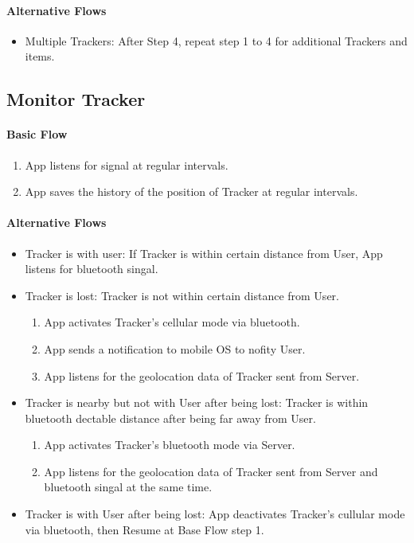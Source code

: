 \documentclass[12pt,a4paper]{article}
\begin{document}
\begin{appendices}
          \paragraph{Alternative Flows}
          \begin{itemize}
            \item Multiple Trackers: After Step 4, repeat step 1 to 4 for additional Trackers and items.
          \end{itemize}
        
        \subsection{Monitor Tracker}
          \paragraph{Basic Flow}
            \begin{enumerate}
              \item App listens for signal at regular intervals.
              \item App saves the history of the position of Tracker at regular intervals.
            \end{enumerate}
          \paragraph{Alternative Flows}
          \begin{itemize}
            \item Tracker is with user: If Tracker is within certain distance from User, App listens for bluetooth singal.
            \item Tracker is lost: Tracker is not within certain distance from User.
            \begin{enumerate}
              \item App activates Tracker's cellular mode via bluetooth.
              \item App sends a notification to mobile OS to nofity User.
              \item App listens for the geolocation data of Tracker sent from Server.
            \end{enumerate}    
            \item Tracker is nearby but not with User after being lost: Tracker is within bluetooth dectable distance after being far away from User.
            \begin{enumerate}
              \item App activates Tracker's bluetooth mode via Server.
              \item App listens for the geolocation data of Tracker sent from Server and bluetooth singal at the same time.
            \end{enumerate}    
            \item Tracker is with User after being lost: App deactivates Tracker's cullular mode via bluetooth, then Resume at Base Flow step 1.
          \end{itemize}
          

\end{appendices}
\end{document}
